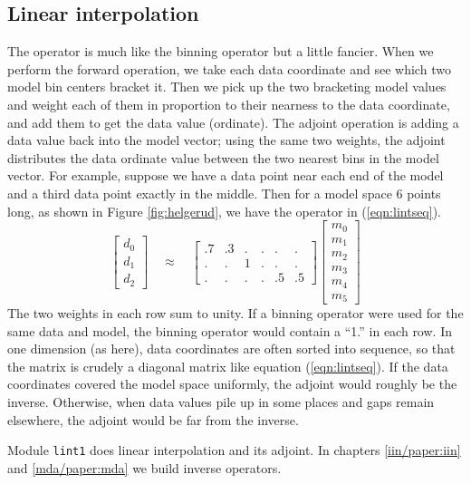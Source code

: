 \subsection{Linear interpolation}
\par
{}
The 
operator is much like the binning operator but a little fancier.
When we perform the forward operation, we take each data coordinate
and see which two model bin centers bracket it.
Then we pick up the two bracketing model values
and weight each of them
in proportion to their nearness to the data coordinate,
and add them to get the data value (ordinate).
The adjoint operation is adding a data value
back into the model vector;
using the same two weights,
the adjoint distributes the data ordinate value
between the two nearest bins in the model vector.
For example, suppose we have a data point near each end of the model
and a third data point exactly in the middle.
Then for a model space 6 points long,
as shown in Figure \ref{fig:helgerud},
we have the operator in (\ref{eqn:lintseq}).
\begin{equation}
\left[ 
\begin{array}{c}
  d_0 \\ 
  d_1 \\ 
  d_2 
  \end{array} \right] 
\quad \approx \quad
\left[ 
\begin{array}{rrrrrr}
   .7 & .3 &  .  & .  & .  & .  \\
   .  & .  &  1  & .  & .  & .  \\
   .  & .  &  .  & .  & .5 & .5 
  \end{array} \right] 
\left[ 
        \begin{array}{c}
          m_0 \\ 
          m_1 \\ 
          m_2 \\ 
          m_3 \\ 
          m_4 \\ 
          m_5
        \end{array}
\right] 
\label{eqn:lintseq}
\end{equation}
The two weights in each row sum to unity.
If a binning operator were used for the same data and model,
the binning operator would contain a ``1.'' in each row.
In one dimension (as here),
data coordinates are often sorted into sequence,
so that the matrix is crudely a diagonal matrix like equation (\ref{eqn:lintseq}).
If the data coordinates covered the model space uniformly,
the adjoint would roughly be the inverse.
Otherwise,
when data values pile up in some places and gaps remain elsewhere,
the adjoint would be far from the inverse.
\par
Module \texttt{lint1} does linear interpolation and its adjoint.
In chapters \ref{iin/paper:iin} and \ref{mda/paper:mda}
we build inverse operators.

